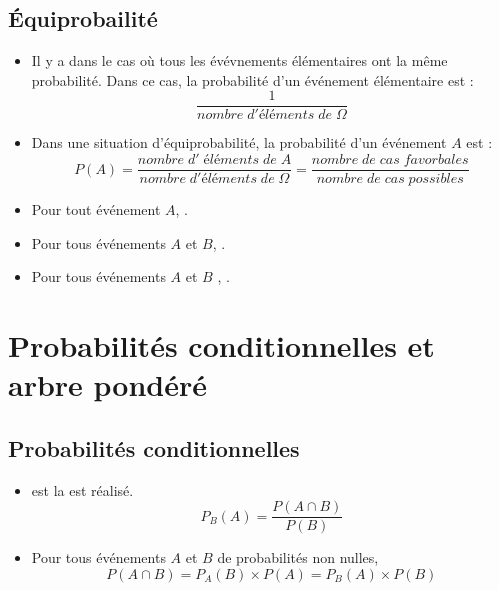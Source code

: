 \documentclass[12pt,a4paper]{article}
\begin{document}
\subsection{\'Equiprobailité}


\begin{mybilan}
	
	\begin{itemize}
		\item Il y a  dans le cas où tous les évévnements élémentaires ont la même probabilité.
		Dans ce cas, la probabilité d'un événement élémentaire est :
		\begin{equation*}
		\dfrac{1}{nombre\; d'éléments\; de\; \Omega}
		\end{equation*}
		
		
		\item Dans une situation d'équiprobabilité, la probabilité d'un événement $A$ est :
		\begin{equation*}
		P(A)=\dfrac{nombre\;d'\;éléments\;de\;A}{nombre\; d'éléments\; de\; \Omega}=\dfrac{nombre\; de\; cas\;favorbales}{nombre\; de\; cas\;possibles}
		\end{equation*}
		
		
		\item Pour tout événement $A$, .
		\item Pour tous événements $A$ et $B$, .
		\item Pour tous événements $A$ et $B$ , .
	\end{itemize}
	
	
	
	
	
	
\end{mybilan}

\section{Probabilités conditionnelles et arbre pondéré}	



\subsection{Probabilités conditionnelles}

\begin{mybilan}
	\begin{itemize}
		\item {} est la  est réalisé.
		\begin{equation*}
			P_B(A)=\dfrac{P(A \cap B)}{P(B)}
		\end{equation*}
		\item Pour tous événements $A$ et $B$ de probabilités non nulles, 
		\begin{equation*}
			P(A\cap B)= P_A(B) \times P(A) = P_B(A) \times P(B)
		\end{equation*}
	\end{itemize}
\end{mybilan}
\end{document}
